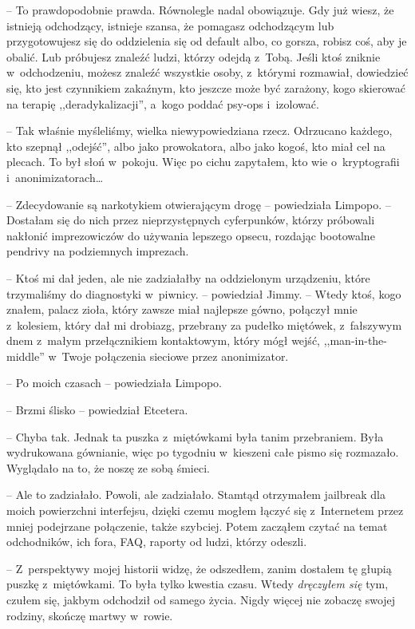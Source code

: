 \documentclass[oneside,polish,11pt,sfheadings]{mwbk}
\begin{document}
-- To prawdopodobnie prawda. Równolegle nadal obowiązuje. Gdy już wiesz,
że istnieją odchodzący, istnieje szansa, że pomagasz odchodzącym lub
przygotowujesz się do oddzielenia się od default albo, co gorsza, robisz
coś, aby je obalić. Lub próbujesz znaleźć ludzi, którzy odejdą z~Tobą.
Jeśli ktoś zniknie w~odchodzeniu, możesz znaleźć wszystkie osoby, z~którymi rozmawiał, dowiedzieć się, kto jest czynnikiem zakaźnym, kto
jeszcze może być zarażony, kogo skierować na terapię
,,deradykalizacji'', a~kogo poddać psy-ops i~izolować.

-- Tak właśnie myśleliśmy, wielka niewypowiedziana rzecz. Odrzucano
każdego, kto szepnął ,,odejść'', albo jako prowokatora, albo jako kogoś,
kto miał cel na plecach. To był słoń w~pokoju. Więc po cichu zapytałem,
kto wie o~kryptografii i~anonimizatorach\ldots 

-- Zdecydowanie są narkotykiem otwierającym drogę -- powiedziała Limpopo.
-- Dostałam się do nich przez nieprzystępnych cyferpunków, którzy
próbowali nakłonić imprezowiczów do używania lepszego opsecu, rozdając
bootowalne pendrivy na podziemnych imprezach.

-- Ktoś mi dał jeden, ale nie zadziałałby na oddzielonym urządzeniu,
które trzymaliśmy do diagnostyki w~piwnicy. -- powiedział Jimmy. -- Wtedy
ktoś, kogo znałem, palacz zioła, który zawsze miał najlepsze gówno,
połączył mnie z~kolesiem, który dał mi drobiazg, przebrany za pudełko
miętówek, z~fałszywym dnem z~małym przełącznikiem kontaktowym, który
mógł wejść, ,,man-in-the-middle'' w~Twoje połączenia sieciowe przez
anonimizator.

-- Po moich czasach -- powiedziała Limpopo.

-- Brzmi ślisko -- powiedział Etcetera.

-- Chyba tak. Jednak ta puszka z~miętówkami była tanim przebraniem. Była
wydrukowana gównianie, więc po tygodniu w~kieszeni całe pismo się
rozmazało. Wyglądało na to, że noszę ze sobą śmieci.

-- Ale to zadziałało. Powoli, ale zadziałało. Stamtąd otrzymałem
jailbreak dla moich powierzchni interfejsu, dzięki czemu mogłem łączyć
się z~Internetem przez mniej podejrzane połączenie, także szybciej.
Potem zacząłem czytać na temat odchodników, ich fora, FAQ, raporty od
ludzi, którzy odeszli.

-- Z~perspektywy mojej historii widzę, że odszedłem, zanim dostałem tę
głupią puszkę z~miętówkami. To była tylko kwestia czasu. Wtedy
\textit{dręczyłem się} tym, czułem się, jakbym odchodził od samego życia.
Nigdy więcej nie zobaczę swojej rodziny, skończę martwy w~rowie.
\end{document}
